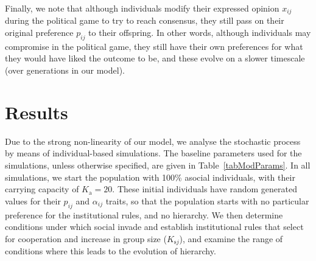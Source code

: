 \documentclass{rstb}
\begin{document}
\begin{linenumbers}
Finally, we note that although individuals modify their expressed opinion $x_{ij}$ during the political game to try to reach consensus, they still pass on their original preference $p_{ij}$ to their offspring. In other words, although individuals may compromise in the political game, they still have their own preferences for what they would have liked the outcome to be, and these evolve on a slower timescale (over generations in our model).

\section*{Results}
Due to the strong non-linearity of our model, we analyse the stochastic process by means of individual-based simulations. The baseline parameters used for the simulations, unless otherwise specified, are given in Table~\ref{tabModParams}. In all simulations, we start the population with 100\% asocial individuals, with their carrying capacity of $K_\mathrm{a}=20$. These initial individuals have random generated values for their $p_{ij}$ and $\alpha_{ij}$ traits, so that the population starts with no particular preference for the institutional rules, and no hierarchy. We then determine conditions under which social invade and establish institutional rules that select for cooperation and increase in group size ($K_{\mathrm{s}j}$), and examine the range of conditions where this leads to the evolution of hierarchy. 


\end{linenumbers}
\end{document}
